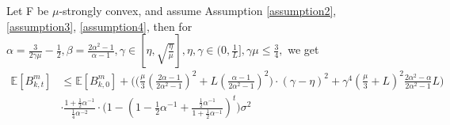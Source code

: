 \begin{proposition} \label{propositionD.5}
Let F be $\mu$-strongly convex, and assume Assumption \ref{assumption2}, \ref{assumption3}, \ref{assumption4}, then for $\alpha=\frac{3}{2\gamma\mu} - \frac{1}{2}, \beta=\frac{2\alpha^2-1}{\alpha-1}, \gamma \in [\eta, \sqrt{\frac{\eta}{\mu}}], \eta, \gamma \in (0, \frac{1}{L}], \gamma\mu \leq \frac{3}{4},$ we get
\begin{align*}
    \mathbb{E}[B_{k, t}^m] &\leq \mathbb{E}[B_{k, 0}^m] + \bigg( \Big(\frac{\mu}{3} (\frac{2\alpha-1}{2\alpha^2 -1})^2 + L(\frac{\alpha-1}{2\alpha^2 -1})^2 \Big)\cdot(\gamma - \eta)^2+ \gamma^4 (\frac{\mu}{3} + L)^2 \frac{2\alpha^2 - \alpha}{2\alpha^2 - 1}L \bigg) \\
    &\cdot \frac{1 + \frac{1}{2}\alpha^{-1}}{\frac{1}{4}\alpha^{-2}} \cdot \Big( 1-(1-\frac{1}{2}\alpha^{-1}+\frac{\frac{1}{2}\alpha^{-1}}{1+\frac{1}{2}\alpha^{-1}})^t\Big)\sigma^2
\end{align*}
\end{proposition}

